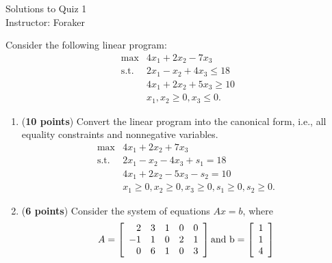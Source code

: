 \documentclass[10pt]{article}
\begin{document}
\begin{center}
  {\sc Solutions to Quiz 1}\\
  {\sc Instructor: Foraker}
\end{center}

\medskip

Consider the following linear program:
\[
\begin{array}{ll}
  \max & 4 x_1 + 2x_2 - 7 x_3 \\
  \mbox{s.t.} & 2 x_1 -  x_2 + 4 x_3 \leq 18 \\
  &  4 x_1 + 2 x_2 + 5 x_3 \geq 10 \\
  & x_1 , x_2 \geq 0, x_3 \leq 0.
\end{array}
\]
\begin{enumerate}
\item ({\bf 10 points}) Convert the linear program into the canonical form, i.e., all equality constraints and nonnegative variables.
\[
\begin{array}{ll}
  \max & 4 x_1 + 2x_2 + 7 x_3 \\
  \mbox{s.t.} & 2 x_1 -  x_2 - 4 x_3 + s_1 = 18 \\
  &  4 x_1 + 2 x_2 - 5 x_3 - s_2 = 10 \\
  & x_1 \geq 0, x_2 \geq 0, x_3 \geq 0, s_1 \geq 0, s_2 \geq 0.
\end{array}
\]
  \vfill
\item ({\bf 6 points}) Consider the system of equations $Ax=b$, where 
\[ A = \left[
\begin{array}{rrrrrrrrrr}
2 & 3 & 1 & 0 & 0\\
-1 & 1 & 0 & 2 & 1\\
0 & 6 & 1 & 0 & 3
\end{array}
\right]
\rm{and~}
b = \left[
\begin{array}{r}
1\\
1\\
4
\end{array}
\right]
\]


\end{enumerate}
\end{document}
